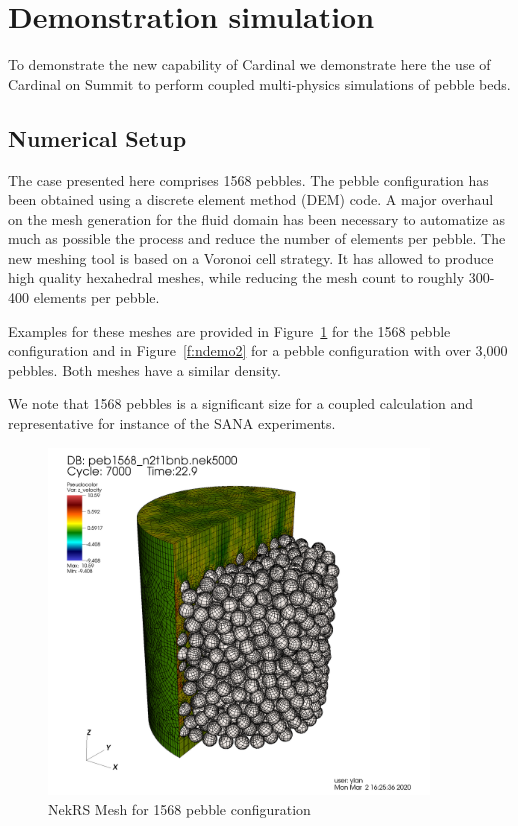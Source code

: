 \section{Demonstration simulation}
\label{s:demo}

To demonstrate the new capability of Cardinal we demonstrate here the use of Cardinal on Summit to perform coupled multi-physics simulations of pebble beds.

\subsection{Numerical Setup}

The case presented here comprises 1568 pebbles. The pebble configuration has been obtained using a discrete element method (DEM) code. A major overhaul on the mesh generation  for the fluid domain has been necessary to automatize as much as possible the process and reduce the number of elements per pebble. The new meshing tool is based on a Voronoi cell strategy. It has allowed to produce high quality hexahedral meshes, while reducing the mesh count to roughly 300-400 elements per pebble.

Examples for these meshes are provided in Figure~\ref{f:ndemo1} for the 1568 pebble configuration and in Figure~\ref{f:ndemo2} for a pebble configuration with over 3,000 pebbles. Both meshes have a similar density.

We note that 1568 pebbles is a significant size for a coupled calculation and representative for instance of the SANA experiments.

\begin{figure}[!h]
\centering
\includegraphics[clip=true,width=0.9\textwidth]{Figures/ndemo_r1}
\caption{NekRS Mesh for 1568 pebble configuration}
\label{f:ndemo1}
\end{figure}

